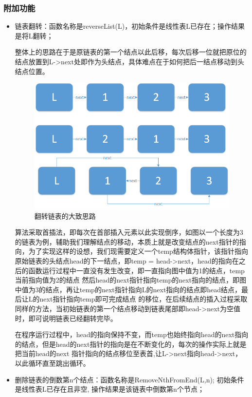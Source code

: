 \documentclass[supercite]{Experimental_Report}
\theoremstyle{definition}
\begin{document}
\subsubsection{附加功能}
\begin{itemize}
	\item 链表翻转：函数名称是reverseList(L)，初始条件是线性表L已存在；操作结果是将L翻转；

	      整体上的思路在于是原链表的第一个结点以此后移，每次后移一位就把原位的结点放置到L->next处即作为头结点，具体难点在于如何把后一结点移动到头结点位置。
	      \begin{figure}[htb]
		      \begin{center}
			      \includegraphics[scale=0.50]{images/pic-4.png}
			      \caption{翻转链表的大致思路}
			      \label{fig1-3}
		      \end{center}
	      \end{figure}
	      算法采取首插法，即每次在首部插入元素以此实现倒序，如图以一个长度为3的链表为例，辅助我们理解结点的移动，本质上就是改变结点的next指针的指向，为了实现这样的设想，我们现需要定义一个temp结构体指针，该指针指向
	      原始链表的头结点head的下一结点，即temp = head->next，head的指向在之后的函数运行过程中一直没有发生改变，即一直指向图中值为1的结点，temp当前指向值为2的结点
	      然后head的next指针指向temp的next指向的结点，即图中值为3的结点，再让temp的next指针指向L的next指向的结点即head结点，最后让L的next指针指向temp即可完成结点
	      的移位，在后续结点的插入过程采取同样的方法，当初始链表的第一个结点移动到链表尾部即head->next为空值时，即可说明链表已经翻转完毕。

	      在程序运行过程中，head的指向保持不变，而temp也始终指向head的next指向的结点，但是head的next指针的指向是在不断变化的，每次的操作实际上就是把当前head的next
	      指针指向的结点移位至表首,让L->next指向head->next，以此循环直至跳出循环。
	\item 删除链表的倒数第n个结点：函数名称是RemoveNthFromEnd(L,n); 初始条件是线性表L已存在且非空, 操作结果是该链表中倒数第n个节点；


\end{itemize}
\end{document}
